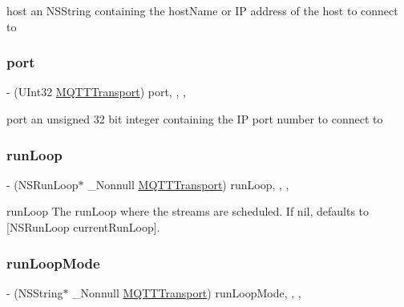 host an N\+S\+String containing the host\+Name or IP address of the host to connect to \mbox{\label{protocol_m_q_t_t_transport_01-p_a62ecc92bb9e7e1f0cd94b4add918c711}} 
\subsubsection{\texorpdfstring{port}{port}}
{\footnotesize\ttfamily -\/ (U\+Int32 \hyperlink{interface_m_q_t_t_transport}{M\+Q\+T\+T\+Transport}) port\hspace{0.3cm}{\ttfamily [read]}, {\ttfamily [write]}, {\ttfamily [nonatomic]}, {\ttfamily [assign]}}

port an unsigned 32 bit integer containing the IP port number to connect to \mbox{\label{protocol_m_q_t_t_transport_01-p_a7b97ce4c4dcc299bcf68909cd31eb3d9}} 
\subsubsection{\texorpdfstring{run\+Loop}{runLoop}}
{\footnotesize\ttfamily -\/ (N\+S\+Run\+Loop$\ast$ \+\_\+\+Nonnull \hyperlink{interface_m_q_t_t_transport}{M\+Q\+T\+T\+Transport}) run\+Loop\hspace{0.3cm}{\ttfamily [read]}, {\ttfamily [write]}, {\ttfamily [nonatomic]}, {\ttfamily [strong]}}

run\+Loop The run\+Loop where the streams are scheduled. If nil, defaults to \mbox{[}N\+S\+Run\+Loop current\+Run\+Loop\mbox{]}. \mbox{\label{protocol_m_q_t_t_transport_01-p_af671f3734cc589cfca98add6750ac45d}} 
\subsubsection{\texorpdfstring{run\+Loop\+Mode}{runLoopMode}}
{\footnotesize\ttfamily -\/ (N\+S\+String$\ast$ \+\_\+\+Nonnull \hyperlink{interface_m_q_t_t_transport}{M\+Q\+T\+T\+Transport}) run\+Loop\+Mode\hspace{0.3cm}{\ttfamily [read]}, {\ttfamily [write]}, {\ttfamily [nonatomic]}, {\ttfamily [strong]}}

